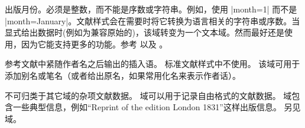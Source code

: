 \begin{fieldlist}


出版月份。必须是整数，而不能是序数或字符串。例如，使用 |month={1}| 而不是 |month={January}|。文献样式会在需要时将它转换为语言相关的字符串或序数。当显式给出数据时(例如为兼容原始的\bibtex )，该域转变为一个文本域。然而最好还是使用，因为它能支持更多的功能。参考  以及 。




参考文献中紧随作者名之后输出的插入语。
标准文献样式中不使用。
该域可用于添加别名或笔名（或者给出原名，如果常用化名来表示作者话）。




不可归类于其它域的杂项文献数据。
 域可以用于记录自由格式的文献数据。
 域包含一些典型信息，例如“Reprint of the edition London 1831”这样出版信息。
另见  域。




\end{fieldlist}
